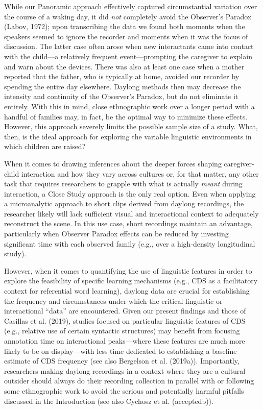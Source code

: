 \documentclass[,man,floatsintext]{apa6}
\begin{document}
While our Panoramic approach effectively captured circumstantial
variation over the course of a waking day, it did \emph{not} completely
avoid the Observer's Paradox (Labov, 1972); upon transcribing the data
we found both moments when the speakers seemed to ignore the recorder
and moments when it was the focus of discussion. The latter case often
arose when new interactants came into contact with the child---a
relatively frequent event---prompting the caregiver to explain and warn
about the devices. There was also at least one case when a mother
reported that the father, who is typically at home, avoided our recorder
by spending the entire day elsewhere. Daylong methods then may decrease
the intensity and continuity of the Observer's Paradox, but do not
eliminate it entirely. With this in mind, close ethnographic work over a
longer period with a handful of families may, in fact, be the optimal
way to minimize these effects. However, this approach severely limits
the possible sample size of a study. What, then, is the ideal approach
for exploring the variable linguistic environments in which children are
raised?

When it comes to drawing inferences about the deeper forces shaping
caregiver-child interaction and how they vary across cultures or, for
that matter, any other task that requires researchers to grapple with
what is actually \emph{meant} during interaction, a Close Study approach
is the only real option. Even when applying a microanalytic approach to
short clips derived from daylong recordings, the researcher likely will
lack sufficient visual and interactional context to adequately
reconstruct the scene. In this use case, short recordings maintain an
advantage, particularly when Observer Paradox effects can be reduced by
investing significant time with each observed family (e.g., over a
high-density longitudinal study).

However, when it comes to quantifying the use of linguistic features in
order to explore the feasibility of specific learning mechanisms (e.g.,
CDS as a facilitatory context for referential word learning), daylong
data are crucial for establishing the frequency and circumstances under
which the critical linguistic or interactional \enquote{data} are
encountered. Given our present findings and those of Casillas et al.
(2019), studies focused on particular linguistic features of CDS (e.g.,
relative use of certain syntactic structures) may benefit from focusing
annotation time on interactional peaks---where these features are much
more likely to be on display---with less time dedicated to establishing
a baseline estimate of CDS frequency (see also Bergelson et al.
(2019a)). Importantly, researchers making daylong recordings in a
context where they are a cultural outsider should always do their
recording collection in parallel with or following some ethnographic
work to avoid the serious and potentially harmful pitfalls discussed in
the Introduction (see also Cychosz et al. (acceptedb)).
\end{document}
